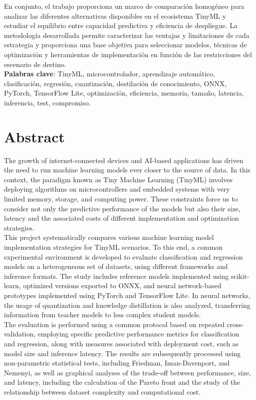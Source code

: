 \documentclass[a4paper,12pt,twoside,final]{book}
\begin{document}
En conjunto, el trabajo proporciona un marco de comparación homogéneo para analizar las diferentes alternativas
disponibles en el ecosistema TinyML y estudiar el equilibrio entre capacidad predictiva y eficiencia de despliegue. La
metodología desarrollada permite caracterizar las ventajas y limitaciones de cada estrategia y proporciona una base
objetiva para seleccionar modelos, técnicas de optimización y herramientas de implementación en función de las
restricciones del escenario de destino.\\

\textbf{Palabras clave}: TinyML, microcontrolador, aprendizaje automático, clasificación, regresión, cuantización,
destilación de conocimiento, ONNX, PyTorch, TensorFlow Lite, optimización, eficiencia, memoria, tamaño, latencia,
inferencia, test, compromiso.

\chapter*{Abstract}

The growth of internet-connected devices and AI-based applications has driven the need to run machine learning models
ever closer to the source of data. In this context, the paradigm known as Tiny Machine Learning (TinyML) involves
deploying algorithms on microcontrollers and embedded systems with very limited memory, storage, and computing power.
These constraints force us to consider not only the predictive performance of the models but also their size, latency
and the associated costs of different implementation and optimization strategies.\\

This project systematically compares various machine learning model implementation strategies for TinyML scenarios. To
this end, a common experimental environment is developed to evaluate classification and regression models on a
heterogeneous set of datasets, using different frameworks and inference formats. The study includes reference models
implemented using scikit-learn, optimized versions exported to ONNX, and neural network-based prototypes implemented
using PyTorch and TensorFlow Lite. In neural networks, the usage of quantization and knowledge distillation is also
analyzed, transferring information from teacher models to less complex student models.\\

The evaluation is performed using a common protocol based on repeated cross-validation, employing specific predictive
performance metrics for classification and regression, along with measures associated with deployment cost, such as
model size and inference latency. The results are subsequently processed using non-parametric statistical tests,
including Friedman, Iman-Davenport, and Nemenyi, as well as graphical analyses of the trade-off between performance,
size, and latency, including the calculation of the Pareto front and the study of the relationship between dataset
complexity and computational cost.\\
\end{document}
